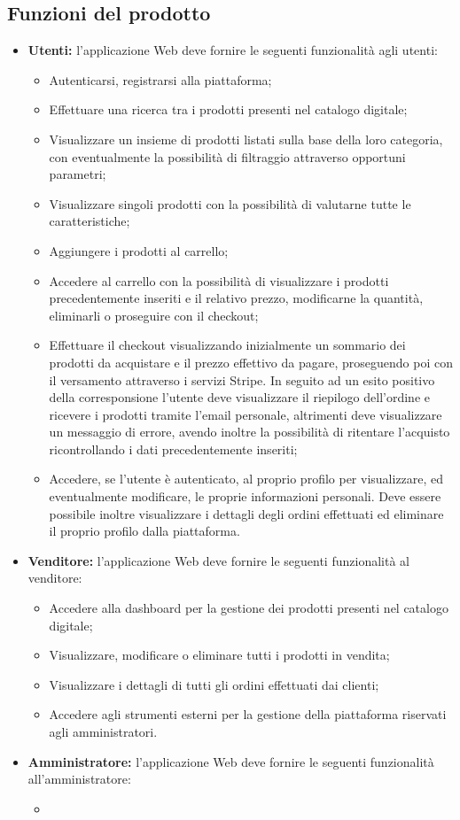 \subsection{Funzioni del prodotto}
\begin{itemize}
\item \textbf{Utenti:} l'applicazione Web deve fornire le seguenti funzionalità agli utenti:
	\begin{itemize}
	\item Autenticarsi, registrarsi alla piattaforma;
	\item Effettuare una ricerca tra i prodotti presenti nel catalogo digitale;
	\item Visualizzare un insieme di prodotti listati sulla base della loro categoria, con eventualmente la possibilità di filtraggio attraverso opportuni parametri;
	\item Visualizzare singoli prodotti con la possibilità di valutarne tutte le caratteristiche;
	\item Aggiungere i prodotti al carrello;
	\item Accedere al carrello con la possibilità di visualizzare i prodotti precedentemente inseriti e il relativo prezzo, modificarne la quantità, eliminarli o proseguire con il checkout;
	\item Effettuare il checkout visualizzando inizialmente un sommario dei prodotti da acquistare e il prezzo effettivo da pagare, proseguendo poi con il versamento attraverso i servizi Stripe. In seguito ad un esito positivo della corresponsione l'utente deve visualizzare il riepilogo dell'ordine e ricevere i prodotti tramite l'email personale, altrimenti deve visualizzare un messaggio di errore, avendo inoltre la possibilità di ritentare l'acquisto ricontrollando i dati precedentemente inseriti;
	\item Accedere, se l'utente è autenticato, al proprio profilo per visualizzare, ed eventualmente modificare, le proprie informazioni personali. Deve essere possibile inoltre visualizzare i dettagli degli ordini effettuati ed eliminare il proprio profilo dalla piattaforma.
	\end{itemize}
\item \textbf{Venditore:} l'applicazione Web deve fornire le seguenti funzionalità al venditore:
	\begin{itemize}
	\item Accedere alla dashboard per la gestione dei prodotti presenti nel catalogo digitale;
	\item Visualizzare, modificare o eliminare tutti i prodotti in vendita;
	\item Visualizzare i dettagli di tutti gli ordini effettuati dai clienti;
	\item Accedere agli strumenti esterni per la gestione della piattaforma riservati agli amministratori.
	\end{itemize}
\item \textbf{Amministratore:} l'applicazione Web deve fornire le seguenti funzionalità all'amministratore:
	\begin{itemize}
	\item 
	\end{itemize}
\end{itemize}
